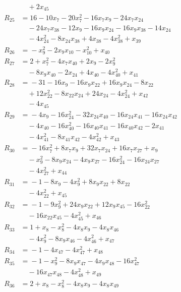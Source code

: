 \begin{align*}
&\quad{} +2x_{45} \\
R_{25} &={} 16 -10x_{7} -20x_{7}^{2} -16x_{7}x_{9} -24x_{7}x_{24} \\
&\quad{} -24x_{7}x_{38} -12x_{9} -16x_{9}x_{24} -16x_{9}x_{38} -14x_{24} \\
&\quad{} -4x_{24}^{2} -8x_{24}x_{38} +4x_{38} -4x_{38}^{2} +x_{39} \\
R_{26} &={} -x_{9}^{2} -2x_{9}x_{10} -x_{10}^{2} +x_{40} \\
R_{27} &={} 2 +x_{7}^{2} -4x_{7}x_{40} +2x_{9} -2x_{9}^{2} \\
&\quad{} -8x_{9}x_{40} -2x_{24} +4x_{40} -4x_{40}^{2} +x_{41} \\
R_{28} &={} -31 -16x_{9} -16x_{9}x_{22} +16x_{9}x_{24} -8x_{22} \\
&\quad{} +12x_{22}^{2} -8x_{22}x_{24} +24x_{24} -4x_{24}^{2} +x_{42} \\
&\quad{} -4x_{45} \\
R_{29} &={} -4x_{9} -16x_{24}^{2} -32x_{24}x_{40} -16x_{24}x_{41} -16x_{24}x_{42} \\
&\quad{} -4x_{40} -16x_{40}^{2} -16x_{40}x_{41} -16x_{40}x_{42} -2x_{41} \\
&\quad{} -4x_{41}^{2} -8x_{41}x_{42} -4x_{42}^{2} +x_{43} \\
R_{30} &={} -16x_{7}^{2} +8x_{7}x_{9} +32x_{7}x_{24} +16x_{7}x_{27} +x_{9} \\
&\quad{} -x_{9}^{2} -8x_{9}x_{24} -4x_{9}x_{27} -16x_{24}^{2} -16x_{24}x_{27} \\
&\quad{} -4x_{27}^{2} +x_{44} \\
R_{31} &={} -1 -8x_{9} -4x_{9}^{2} +8x_{9}x_{22} +8x_{22} \\
&\quad{} -4x_{22}^{2} +x_{45} \\
R_{32} &={} -1 -9x_{9}^{2} +24x_{9}x_{22} +12x_{9}x_{45} -16x_{22}^{2} \\
&\quad{} -16x_{22}x_{45} -4x_{45}^{2} +x_{46} \\
R_{33} &={} 1 +x_{8} -x_{8}^{2} -4x_{8}x_{9} -4x_{8}x_{46} \\
&\quad{} -4x_{9}^{2} -8x_{9}x_{46} -4x_{46}^{2} +x_{47} \\
R_{34} &={} -1 -4x_{47} -4x_{47}^{2} +x_{48} \\
R_{35} &={} -1 -x_{9}^{2} -8x_{9}x_{47} -4x_{9}x_{48} -16x_{47}^{2} \\
&\quad{} -16x_{47}x_{48} -4x_{48}^{2} +x_{49} \\
R_{36} &={} 2 +x_{8} -x_{8}^{2} -4x_{8}x_{9} -4x_{8}x_{49} \\

\end{align*}
